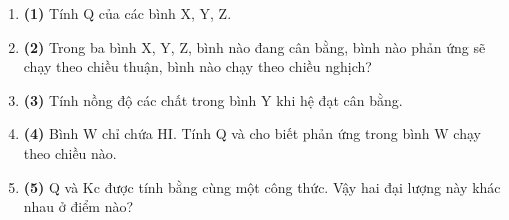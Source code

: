 \qhead
\begin{enumerate}[label={}, leftmargin=0.5em, itemsep=6pt]
\item \textbf{(1)} Tính Q của các bình X, Y, Z. 
\item \textbf{(2)} Trong ba bình X, Y, Z, bình nào đang cân bằng, bình nào phản ứng sẽ chạy theo chiều thuận, bình nào chạy theo chiều nghịch? 
\item \textbf{(3)} Tính nồng độ các chất trong bình Y khi hệ đạt cân bằng. 
\item \textbf{(4)} Bình W chỉ chứa HI. Tính Q và cho biết phản ứng trong bình W chạy theo chiều nào. 
\item \textbf{(5)} Q và Kc được tính bằng cùng một công thức. Vậy hai đại lượng này khác nhau ở điểm nào? 
\end{enumerate}
